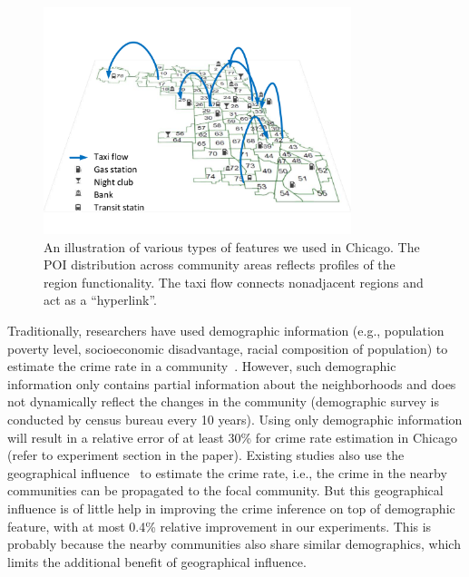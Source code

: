 \begin{figure}[t]
\centering
\includegraphics[width=0.8\textwidth]{fig/demo.pdf}
\caption{An illustration of various types of features we used in Chicago. The POI distribution across community areas reflects profiles of the region functionality. The taxi flow connects nonadjacent regions and act as a ``hyperlink''.}
\label{fig:demo}
\end{figure}

Traditionally, researchers have used demographic information (e.g., population poverty level, socioeconomic disadvantage, racial composition of population) to estimate the crime rate in a community~\cite{GrSa09}. However,  such demographic information only contains partial information about the neighborhoods and does not dynamically reflect the changes in the community (demographic survey is conducted by census bureau every 10 years). Using only demographic information will result in a relative error of at least 30\% for crime rate estimation in Chicago (refer to experiment section in the paper). Existing studies also use the geographical influence~\cite{Ans02} to estimate the crime rate, i.e., the crime in the nearby communities can be propagated to the focal community. But this geographical influence is of little help in improving the crime inference on top of demographic feature, with at most 0.4\% relative improvement in our experiments. This is probably because the nearby communities also share similar demographics, which limits the additional benefit of geographical influence.



